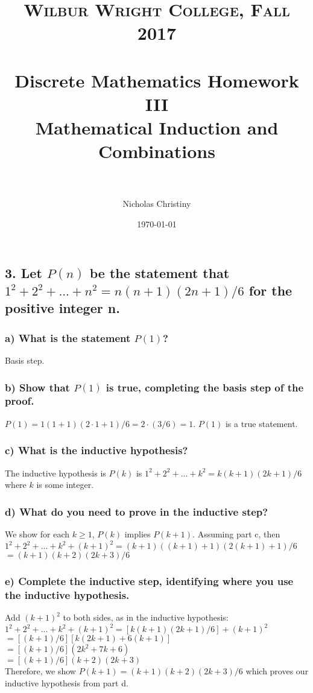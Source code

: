 \documentclass[11pt, oneside]{article} %
\title{
\normalfont \normalsize
\textsc{Wilbur Wright College, Fall 2017} \\ [25pt] %
\horrule{0.5pt} \\[0.4cm] %
\huge Discrete Mathematics Homework III \\
\huge Mathematical Induction and Combinations \\ %
\horrule{2pt} \\[0.5cm] %
}
\author{Nicholas Christiny} %
\date{\normalsize\today} %
\numberwithin{equation}{section} %
\numberwithin{figure}{section} %
\numberwithin{table}{section} %
\begin{document}
\maketitle %


\section{}
\subsection{3. Let $P(n)$ be the statement that $1^2 + 2^2 +...+n^2 = n(n + 1)(2n + 1)/6$ for the positive integer n.}
\subsubsection{a) What is the statement $P(1)$?}
Basis step. 
\subsubsection{b) Show that $P(1)$ is true, completing the basis step of the proof.}
$P(1)=1(1+1)(2\cdot 1+1)/6 = 2\cdot (3/6)  = 1$. $P(1)$ is a true statement.
\subsubsection{c) What is the inductive hypothesis?}
The inductive hypothesis is $P(k)$ is $1^2 + 2^2 +...+k^2 = k(k + 1)(2k + 1)/6$ where $k$ is some integer.
\subsubsection{d) What do you need to prove in the inductive step?}
We show for each $k\geq 1$, $P(k)$ implies $P(k+1)$. Assuming part c, then \\
$1^2 + 2^2 +...+ k^2 +(k+1)^2 = (k+1)((k+1) + 1)(2(k+1) + 1)/6$ \\
$= (k+1)(k+2)(2k+3)/6$
\subsubsection{e) Complete the inductive step, identifying where you use the inductive hypothesis.}
Add $(k+1)^2$ to both sides, as in the inductive hypothesis: \\
$1^2 + 2^2 +...+k^2 +(k+1)^2 =[k(k + 1)(2k+ 1)/6] + (k + 1)^2$ \\
$= [(k+1)/6][k(2k+1)+6(k+1)]$ \\
$= [(k+1)/6](2k^2 + 7k + 6) $ \\
$= [(k+1)/6](k+2)(2k+3)$ \\
Therefore, we show $P(k+1) = (k+1)(k+2)(2k+3)/6$ which proves our inductive hypothesis from part d.
\end{document}
